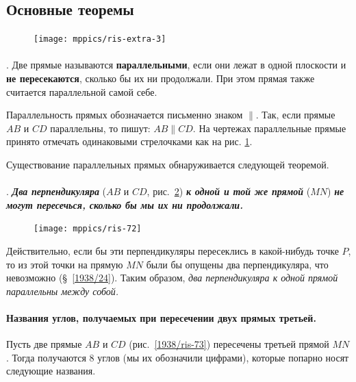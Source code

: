 \subsection*{Основные теоремы}

{

\begin{figure}
\vskip-5mm
\centering
\texttt{[image: mppics/ris-extra-3]}
\caption{}\label{extra/ris-3}
\end{figure}

\paragraph{}\label{1938/70}
\mbox{.}
Две прямые называются \textbf{параллельными}, если они лежат в одной плоскости и \textbf{не пересекаются}, сколько бы их ни продолжали.
При этом прямая также считается параллельной самой себе.


Параллельность прямых обозначается письменно знаком $\parallel$.
Так, если прямые $AB$ и $CD$ параллельны, то пишут:
$AB \parallel CD$. 
На чертежах параллельные прямые принято отмечать одинаковыми стрелочками как на рис. \ref{extra/ris-3}.

Существование параллельных прямых обнаруживается следующей теоремой.

}

\paragraph{}\label{1938/71}
\mbox{.}
\textbf{\emph{Два перпендикуляра}} ($AB$ и $CD$, рис.~\ref{1938/ris-72}) \textbf{\emph{к одной и той же прямой}} ($MN$) \textbf{\emph{не могут пересечься, сколько бы мы их ни продолжали.}}

\begin{figure}
\vskip-0mm
\centering
\texttt{[image: mppics/ris-72]}
\caption{}\label{1938/ris-72}
\end{figure}

Действительно, если бы эти перпендикуляры пересеклись в какой-нибудь точке $P$, то из этой точки на прямую $MN$ были бы опущены два перпендикуляра, что невозможно (§~\ref{1938/24}).
Таким образом, \emph{два перпендикуляра к одной прямой параллельны между собой.}

\paragraph{Названия углов, получаемых при пересечении двух прямых третьей.}\label{1938/72}
Пусть две прямые $AB$ и $CD$ (рис.~\ref{1938/ris-73}) пересечены третьей прямой $MN$.
Тогда получаются 8 углов (мы их обозначили цифрами), которые попарно носят следующие названия.

